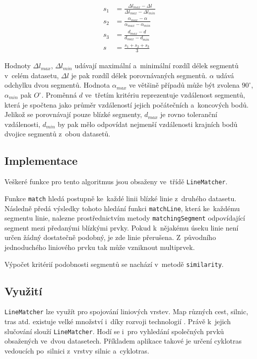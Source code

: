 \begin{equation}
 \begin{aligned}
 s_1 &= \frac{ \Delta l_{max} - \Delta l }{ \Delta l_{max} - \Delta l_{min}} \\ 
 s_2 &= \frac{ \alpha_{max} - \alpha }{ \alpha_{max} - \alpha_{min}} \\ 
 s_3 &= \frac{ d_{max} - d }{ d_{max} - d_{min}} \\ 
 s &= \frac{s_1+s_2+s_3}{3}
 \label{crit}
 \end{aligned}
\end{equation}

Hodnoty $\Delta l_{max}$, $\Delta l_{min}$ udávají maximální a~minimální rozdíl délek
segmentů v~celém datasetu, $\Delta l$ je pak rozdíl délek porovnávaných segmentů.
$\alpha$ udává odchylku dvou segmentů. Hodnota $\alpha_{max}$ ve většině případů může
být zvolena $90^{\circ}$, $\alpha_{min}$ pak $O^\circ$. Proměnná $d$ ve~třetím 
kritériu reprezentuje vzdálenost segmentů, která je spočtena jako průměr vzdáleností
jejich počátečních a~koncových bodů. Jelikož se porovnávají pouze blízké segmenty,
$d_{max}$ je rovno toleranční vzdálenosti, $d_{min}$ by pak mělo odpovídat nejmenší
vzdálenosti krajních bodů dvojice segmentů z~obou datasetů.


\subsection{Implementace} %
\label{lm-implementace}
Veškeré funkce pro tento algoritmus jsou obsaženy ve~třídě \texttt{Line\-Matcher}.

Funkce \texttt{match} hledá postupně ke~každé linii blízké linie z~druhého datasetu.
Následně předá výsledky tohoto hledání funkci \texttt{match\-Line}, která ke~každému
segmentu linie, nalezne prostřednictvím metody \texttt{matching\-Segment} odpovídající
segment mezi předanými blízkými prvky. Pokud k~nějakému úseku linie není určen
žádný dostatečně podobný, je zde linie přerušena. Z~původního jednoduchého liniového
prvku tak může vzniknout multiprvek. 

Výpočet kritérií podobnosti segmentů se nachází v~metodě \texttt{similarity}. 

\subsection{Využití}
\label{lm-vyuziti}

\texttt{LineMatcher} lze využít pro spojování liniových vrstev. Map různých cest, 
silnic, tras atd. existuje velké množství i~díky rozvoji technologií . 
Právě k~jejich slučování slouží \texttt{LineMatcher}. Hodí se i~pro vyhledání 
společných prvků obsažených ve~dvou datasetech. Příkladem aplikace takové je 
určení cyklotras vedoucích po~silnici z~vrstvy silnic a~cyklotras.  %

